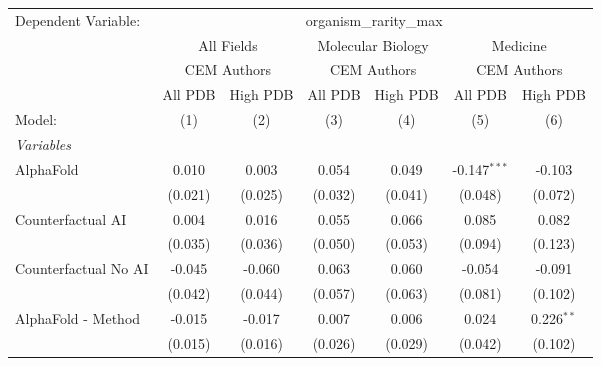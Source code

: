 \begingroup
\centering
\begin{tabular}{lcccccc}
   \tabularnewline \midrule \midrule
   Dependent Variable: & \multicolumn{6}{c}{organism\_rarity\_max}\\
 & \multicolumn{2}{c}{All Fields} & \multicolumn{2}{c}{Molecular Biology} & \multicolumn{2}{c}{Medicine} \\
\cmidrule(lr){2-3} \cmidrule(lr){4-5} \cmidrule(lr){6-7}
 & \multicolumn{2}{c}{CEM Authors} & \multicolumn{2}{c}{CEM Authors} & \multicolumn{2}{c}{CEM Authors} \\
\cmidrule(lr){2-3} \cmidrule(lr){4-5} \cmidrule(lr){6-7}
 & \multicolumn{1}{c}{All PDB} & \multicolumn{1}{c}{High PDB} & \multicolumn{1}{c}{All PDB} & \multicolumn{1}{c}{High PDB} & \multicolumn{1}{c}{All PDB} & \multicolumn{1}{c}{High PDB} \\
\cmidrule(lr){2-2} \cmidrule(lr){3-3} \cmidrule(lr){4-4} \cmidrule(lr){5-5} \cmidrule(lr){6-6} \cmidrule(lr){7-7}
   Model:                                                     & (1)     & (2)          & (3)     & (4)     & (5)            & (6)\\  
   \midrule
   \emph{Variables}\\
   AlphaFold                                                  & 0.010   & 0.003        & 0.054   & 0.049   & -0.147$^{***}$ & -0.103\\   
                                                              & (0.021) & (0.025)      & (0.032) & (0.041) & (0.048)        & (0.072)\\   
   Counterfactual AI                                          & 0.004   & 0.016        & 0.055   & 0.066   & 0.085          & 0.082\\   
                                                              & (0.035) & (0.036)      & (0.050) & (0.053) & (0.094)        & (0.123)\\   
   Counterfactual No AI                                       & -0.045  & -0.060       & 0.063   & 0.060   & -0.054         & -0.091\\   
                                                              & (0.042) & (0.044)      & (0.057) & (0.063) & (0.081)        & (0.102)\\   
   AlphaFold - Method                                         & -0.015  & -0.017       & 0.007   & 0.006   & 0.024          & 0.226$^{**}$\\   
                                                              & (0.015) & (0.016)      & (0.026) & (0.029) & (0.042)        & (0.102)\\   

\end{tabular}
